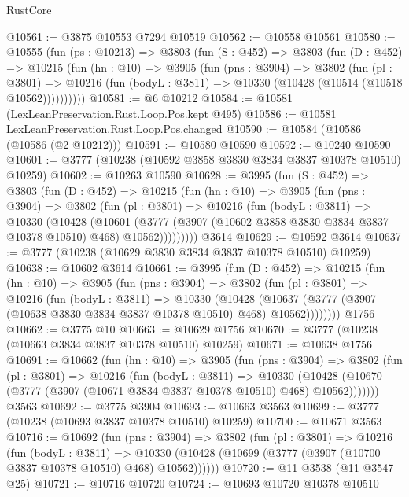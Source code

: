 \begin{lexlean}{RustCore}
\begin{coremodule}
@10561 := @3875 @10553 @7294 @10519
@10562 := @10558 @10561
@10580 := @10555
    (fun (ps : @10213) =>
    @3803
      (fun (S : @452) =>
      @3803
        (fun (D : @452) =>
        @10215
          (fun (hn : @10) =>
          @3905
            (fun (pns : @3904) =>
            @3802
              (fun (pl : @3801) =>
              @10216 (fun (bodyL : @3811) => @10330 (@10428 (@10514 (@10518 @10562))))))))))
@10581 := @6 @10212
@10584 := @10581 (LexLeanPreservation.Rust.Loop.Pos.kept @495)
@10586 := @10581 LexLeanPreservation.Rust.Loop.Pos.changed
@10590 := @10584 (@10586 (@10586 (@2 @10212)))
@10591 := @10580 @10590
@10592 := @10240 @10590
@10601 := @3777 (@10238 (@10592 @3858 @3830 @3834 @3837 @10378 @10510) @10259)
@10602 := @10263 @10590
@10628 := @3995
    (fun (S : @452) =>
    @3803
      (fun (D : @452) =>
      @10215
        (fun (hn : @10) =>
        @3905
          (fun (pns : @3904) =>
          @3802
            (fun (pl : @3801) =>
            @10216
              (fun (bodyL : @3811) =>
              @10330
                (@10428
                  (@10601
                    (@3777
                      (@3907 (@10602 @3858 @3830 @3834 @3837 @10378 @10510) @468)
                      @10562)))))))))
    @3614
@10629 := @10592 @3614
@10637 := @3777 (@10238 (@10629 @3830 @3834 @3837 @10378 @10510) @10259)
@10638 := @10602 @3614
@10661 := @3995
    (fun (D : @452) =>
    @10215
      (fun (hn : @10) =>
      @3905
        (fun (pns : @3904) =>
        @3802
          (fun (pl : @3801) =>
          @10216
            (fun (bodyL : @3811) =>
            @10330
              (@10428
                (@10637 (@3777 (@3907 (@10638 @3830 @3834 @3837 @10378 @10510) @468) @10562))))))))
    @1756
@10662 := @3775 @10
@10663 := @10629 @1756
@10670 := @3777 (@10238 (@10663 @3834 @3837 @10378 @10510) @10259)
@10671 := @10638 @1756
@10691 := @10662
    (fun (hn : @10) =>
    @3905
      (fun (pns : @3904) =>
      @3802
        (fun (pl : @3801) =>
        @10216
          (fun (bodyL : @3811) =>
          @10330
            (@10428 (@10670 (@3777 (@3907 (@10671 @3834 @3837 @10378 @10510) @468) @10562)))))))
    @3563
@10692 := @3775 @3904
@10693 := @10663 @3563
@10699 := @3777 (@10238 (@10693 @3837 @10378 @10510) @10259)
@10700 := @10671 @3563
@10716 := @10692
    (fun (pns : @3904) =>
    @3802
      (fun (pl : @3801) =>
      @10216
        (fun (bodyL : @3811) =>
        @10330 (@10428 (@10699 (@3777 (@3907 (@10700 @3837 @10378 @10510) @468) @10562))))))
@10720 := @11 @3538 (@11 @3547 @25)
@10721 := @10716 @10720
@10724 := @10693 @10720 @10378 @10510

\end{coremodule}
\end{lexlean}
